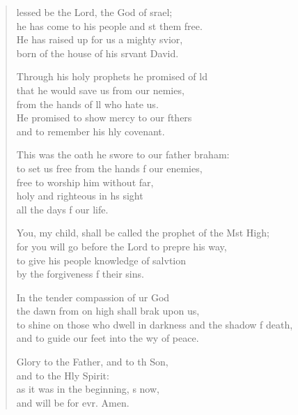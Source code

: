 \begin{verse}
  \begin{patverse}
lessed be the Lord, the God of srael;\Med\\
he has come to his people and st them free.\\
He has raised up for us a mighty svior,\Med\\
born of the house of his srvant David.

Through his holy prophets he promised of ld\Flex\\
that he would save us from our nemies,\Med\\
from the hands of ll who hate us.\\
He promised to show mercy to our fthers\Med\\
and to remember his hly covenant.

This was the oath he swore to our father braham:\Med\\
to set us free from the hands f our enemies,\\
free to worship him without far,\Flex\\
holy and righteous in h\pointup{\i}s sight\Med\\
all the days f our life.

You, my child, shall be called the prophet of the Mst High;\Med\\
for you will go before the Lord to prepre his way,\\
to give his people knowledge of salvtion\Med\\
by the forgiveness f their sins.

In the tender compassion of ur God\Med\\
the dawn from on high shall brak upon us,\\
to shine on those who dwell in darkness and the shadow f death,\Med\\
and to guide our feet into the wy of peace.

Glory to the Father, and to th Son,\Med\\
and to the Hly Spirit:\\
as it was in the beginning, \pointup{\i}s now,\Med\\
and will be for evr. Amen.
  \end{patverse}
  \end{verse}
